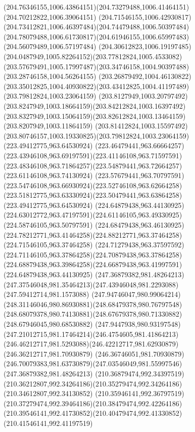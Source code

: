 {{  \curveto(204.76346155,1006.43864151)(204.73279488,1006.41464151)(204.70212822,1006.39064151)
  \curveto(204.71546155,1006.42930817)(204.73412821,1006.46397484)(204.74479488,1006.50397484)
  \curveto(204.78079488,1006.61730817)(204.61946155,1006.65997483)(204.56079489,1006.57197484)
  \curveto(204.30612823,1006.19197485)(204.0487949,1005.82264152)(203.77812824,1005.4533082)
  \curveto(203.57679491,1005.17997487)(203.34746158,1004.90397488)(203.28746158,1004.56264155)
  \curveto(203.26879492,1004.46130822)(203.35012825,1004.40930822)(203.43412825,1004.41197489)
  \moveto(203.79812824,1003.23064159)
  \curveto(203.8127949,1003.20797492)(203.8247949,1003.18664159)(203.84212824,1003.16397492)
  \curveto(203.8327949,1003.15064159)(203.82612824,1003.13464159)(203.8207949,1003.11864159)
  \curveto(203.81412824,1003.15597492)(203.80746157,1003.19330825)(203.79812824,1003.23064159)
  \moveto(223.49412775,963.64530924)
  \curveto(223.46479441,963.66664257)(223.43946108,963.69197591)(223.41146108,963.71597591)
  \curveto(223.48346108,963.71864257)(223.54879441,963.72664257)(223.61146108,963.74130924)
  \curveto(223.57679441,963.70797591)(223.54746108,963.66930924)(223.52746108,963.62664258)
  \curveto(223.51812775,963.63330924)(223.50479441,963.63864258)(223.49412775,963.64530924)
  \moveto(224.64879438,963.44130925)
  \curveto(224.63012772,963.47197591)(224.61146105,963.49330925)(224.58746105,963.50797591)
  \curveto(224.68479438,963.46130925)(224.78212771,963.41464258)(224.88212771,963.37464258)
  \lineto(224.71546105,963.37464258)
  \curveto(224.71279438,963.37597592)(224.71146105,963.37864258)(224.70879438,963.37864258)
  \curveto(224.68879438,963.39864258)(224.66879438,963.41997591)(224.64879438,963.44130925)
  \moveto(247.36879382,981.48264213)
  \curveto(247.37546048,981.35464213)(247.43946048,981.2293088)(247.59412714,981.1573088)
  \curveto(247.94746047,980.99064214)(248.31146046,980.86930881)(248.68479378,980.76797548)
  \curveto(248.68079378,980.74130881)(248.67679378,980.71330882)(248.67946045,980.68530882)
  \curveto(247.9447938,980.93197548)(247.21012715,981.17464214)(246.4754605,981.41864213)
  \curveto(246.46212717,981.5293088)(246.42212717,981.62930879)(246.36212717,981.70930879)
  \lineto(246.36746051,981.70930879)
  \curveto(246.70079383,981.63730879)(247.03546049,981.55997546)(247.36879382,981.48264213)
  \moveto(210.36879474,992.34397519)
  \curveto(210.36212807,992.34264186)(210.35279474,992.34264186)(210.34612807,992.34130852)
  \curveto(210.35946141,992.36797519)(210.37279474,992.39464186)(210.38479474,992.42264186)
  \curveto(210.39546141,992.41730852)(210.40479474,992.41330852)(210.41546141,992.41197519)
}}
